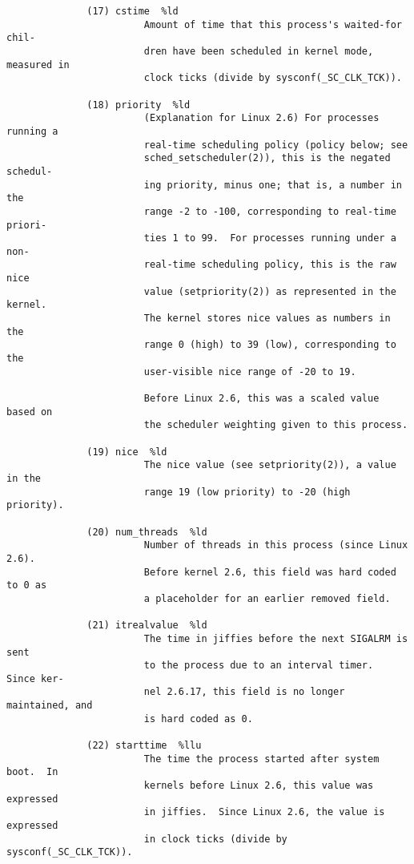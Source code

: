 \documentclass[]{article}
\begin{document}
\begin{verbatim}
              (17) cstime  %ld
                        Amount of time that this process's waited-for chil‐
                        dren have been scheduled in kernel mode, measured in
                        clock ticks (divide by sysconf(_SC_CLK_TCK)).

              (18) priority  %ld
                        (Explanation for Linux 2.6) For processes running a
                        real-time scheduling policy (policy below; see
                        sched_setscheduler(2)), this is the negated schedul‐
                        ing priority, minus one; that is, a number in the
                        range -2 to -100, corresponding to real-time priori‐
                        ties 1 to 99.  For processes running under a non-
                        real-time scheduling policy, this is the raw nice
                        value (setpriority(2)) as represented in the kernel.
                        The kernel stores nice values as numbers in the
                        range 0 (high) to 39 (low), corresponding to the
                        user-visible nice range of -20 to 19.

                        Before Linux 2.6, this was a scaled value based on
                        the scheduler weighting given to this process.

              (19) nice  %ld
                        The nice value (see setpriority(2)), a value in the
                        range 19 (low priority) to -20 (high priority).

              (20) num_threads  %ld
                        Number of threads in this process (since Linux 2.6).
                        Before kernel 2.6, this field was hard coded to 0 as
                        a placeholder for an earlier removed field.

              (21) itrealvalue  %ld
                        The time in jiffies before the next SIGALRM is sent
                        to the process due to an interval timer.  Since ker‐
                        nel 2.6.17, this field is no longer maintained, and
                        is hard coded as 0.

              (22) starttime  %llu
                        The time the process started after system boot.  In
                        kernels before Linux 2.6, this value was expressed
                        in jiffies.  Since Linux 2.6, the value is expressed
                        in clock ticks (divide by sysconf(_SC_CLK_TCK)).


\end{verbatim}
\end{document}
